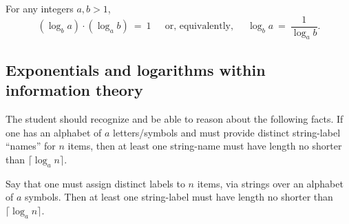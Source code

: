 \begin{prop}
For any integers $a, b >1$,
\begin{equation}
\left(\log_b a \right) \cdot \left( \log_a b \right) \ = \ 1 \ \ \ \ \
\mbox{ or, equivalently, } \ \ \ \ \
\log_b a \ = \ \frac{1}{\log_a b} .
\end{equation}
\end{prop}


\subsection{Exponentials and logarithms within information theory}
\label{sec:count-strings}

The student should recognize and be able to reason about the following
facts.  If one has an alphabet of $a$ letters/symbols and must provide
distinct string-label ``names'' for $n$ items, then at least one
string-name must have length no shorter than $\lceil \log_a n \rceil$.

\begin{prop}
\label{thm:bound-stringnames-lgth-k}
Say that one must assign distinct labels to $n$ items, via strings
over an alphabet of $a$ symbols.  Then at least one string-label must
have length no shorter than $\lceil \log_a n \rceil$.
\end{prop}

